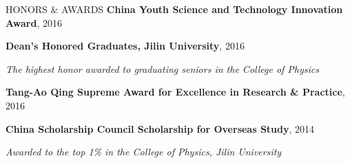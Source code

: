 \documentclass[letterpaper]{resume} %
\newcommand{\myspace}{\vspace{2mm}}
\begin{document}









\begin{rSection}{HONORS \& AWARDS} \itemsep -3pt
{\bf China Youth Science and Technology Innovation Award}, 2016
\item {\bf Dean's Honored Graduates, Jilin University}, 2016
  \vspace{-1mm}
\item \hspace{6mm} \emph{\small The highest honor awarded to graduating
    seniors in the College of Physics}
\item {\bf Tang-Ao Qing Supreme Award for Excellence in Research \&
  Practice}, 2016
\item {\bf China Scholarship Council Scholarship for Overseas Study},
  2014
  \vspace{-1mm}
  \item \hspace{6mm} \emph{\small Awarded to the top 1\% in the College of
    Physics, Jilin University}

\end{rSection}
\end{document}

